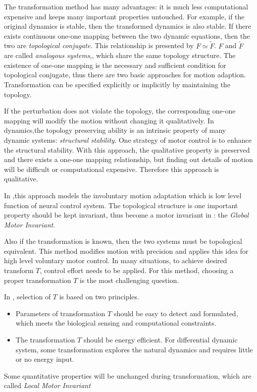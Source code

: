 %
%
The  transformation method has many advantages: it is much less computational expensive and keeps many important properties untouched.
For example, if the original dynamics is stable, then the transformed dynamics is also stable. 
%
If there exists continuous one-one mapping between the two dynamic equations, then the two are \emph{topological conjugate}.
This relationship is presented by $F \simeq \tilde{F}$.
$F$ and $\tilde{F}$ are called \emph{analogous systems},, which share the same topology structure.
The existence of one-one mapping is the necessary and sufficient condition for topological conjugate, thus there are two basic approaches for motion adaption.
Transformation can be specified explicitly or implicitly by maintaining the topology.



If the perturbation does not violate the topology, the corresponding one-one mapping will modify the motion without changing it qualitatively.
In dynamics,the topology preserving ability is an intrinsic property of many dynamic systems:
\emph{structural stability}.
One strategy of motor control is to enhance the structural stability. 
With this approach, the qualitative property is preserved and there exists a one-one mapping relationship, but finding out details of motion will be difficult or computational expensive.
Therefore this approach is qualitative.

In \moit,this approach models the involuntary motion adaptation which is low level function of neural control system.
The topological structure is one important property should be kept invariant, thus become a motor invariant in \moit: the \emph{Global Motor Invariant}.






Also if the transformation is known, then the two systems must be topological equivalent.
This method  modifies motion with precision and \moit applies this idea for high level voluntary motor control.
In many situations, to achieve desired transform $T$, control effort needs to be applied.
For this method, choosing a proper transformation $T$ is the most challenging  question.

In \moit, selection of $T$ is based on two principles.
\begin{itemize}
\item
Parameters of transformation $T$ should be easy to detect and formulated, which meets the biological sensing and computational constraints. 

\item 
The transformation $T$ should be energy efficient.
For differential dynamic system, some transformation explores the natural dynamics and requires little or no energy input.
\end{itemize}
Some quantitative properties will be unchanged during transformation, which are called \emph{Local Motor Invariant}






